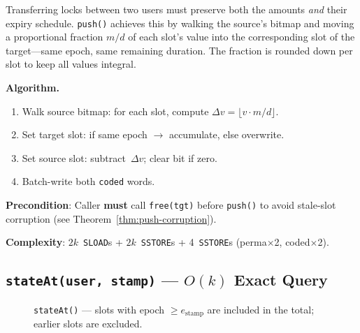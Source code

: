 \documentclass[10pt,a4paper,twocolumn]{article}
\theoremstyle{definition}
\theoremstyle{plain}
\theoremstyle{remark}
\begin{document}
Transferring locks between two users must preserve both the amounts \emph{and} their expiry schedule.  \texttt{push()} achieves this by walking the source's bitmap and moving a proportional fraction $m/d$ of each slot's value into the corresponding slot of the target---same epoch, same remaining duration.  The fraction is rounded down per slot to keep all values integral.

\textbf{Algorithm.}
\begin{enumerate}[leftmargin=*, nosep]
\item Walk source bitmap: for each slot, compute $\Delta v = \lfloor v \cdot m / d \rfloor$.
\item Set target slot: if same epoch $\to$ accumulate, else overwrite.
\item Set source slot: subtract~$\Delta v$; clear bit if zero.
\item Batch-write both \texttt{coded} words.
\end{enumerate}

\textbf{Precondition}: Caller \textbf{must} call \texttt{free(tgt)} before \texttt{push()} to avoid stale-slot corruption (see Theorem~\ref{thm:push-corruption}).

\textbf{Complexity}: $2k$~\texttt{SLOAD}s + $2k$~\texttt{SSTORE}s + 4~\texttt{SSTORE}s (perma$\times$2, coded$\times$2).

\subsection{\texttt{stateAt(user, stamp)} --- $O(k)$ Exact Query}
\label{subsec:stateat}

\begin{figure}[htbp]
\centering
{}
\caption{\texttt{stateAt()} --- slots with epoch $\geq e_{\text{stamp}}$ are included in the total; earlier slots are excluded.}
\label{fig:stateat}
\end{figure}
\end{document}
